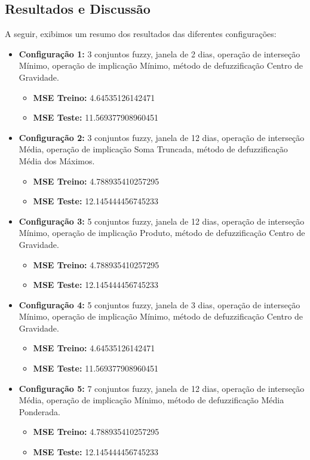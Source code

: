 \documentclass[a4paper, 12pt]{article}
\begin{document}
\subsection{Resultados e Discussão}
A seguir, exibimos um resumo dos resultados das diferentes configurações:

\begin{itemize}
    \item \textbf{Configuração 1:} 3 conjuntos fuzzy, janela de 2 dias, operação de interseção Mínimo, operação de implicação Mínimo, método de defuzzificação Centro de Gravidade.
    \begin{itemize}
        \item \textbf{MSE Treino:} 4.64535126142471
        \item \textbf{MSE Teste:} 11.569377908960451
    \end{itemize}
    \item \textbf{Configuração 2:} 3 conjuntos fuzzy, janela de 12 dias, operação de interseção Média, operação de implicação Soma Truncada, método de defuzzificação Média dos Máximos.
    \begin{itemize}
        \item \textbf{MSE Treino:} 4.788935410257295
        \item \textbf{MSE Teste:} 12.145444456745233
    \end{itemize}
    \item \textbf{Configuração 3:} 5 conjuntos fuzzy, janela de 12 dias, operação de interseção Mínimo, operação de implicação Produto, método de defuzzificação Centro de Gravidade.
    \begin{itemize}
        \item \textbf{MSE Treino:} 4.788935410257295
        \item \textbf{MSE Teste:} 12.145444456745233
    \end{itemize}
    \item \textbf{Configuração 4:} 5 conjuntos fuzzy, janela de 3 dias, operação de interseção Mínimo, operação de implicação Mínimo, método de defuzzificação Centro de Gravidade.
    \begin{itemize}
        \item \textbf{MSE Treino:} 4.64535126142471
        \item \textbf{MSE Teste:} 11.569377908960451
    \end{itemize}
    \item \textbf{Configuração 5:} 7 conjuntos fuzzy, janela de 12 dias, operação de interseção Média, operação de implicação Mínimo, método de defuzzificação Média Ponderada.
    \begin{itemize}
        \item \textbf{MSE Treino:} 4.788935410257295
        \item \textbf{MSE Teste:} 12.145444456745233
    \end{itemize}
\end{itemize}
\end{document}
